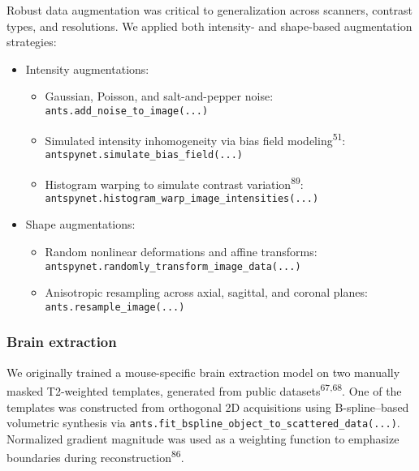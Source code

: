 \documentclass[
  12pt,
]{article}
\providecommand{\tightlist}{%
  \setlength{\itemsep}{0pt}\setlength{\parskip}{0pt}}
\begin{document}
Robust data augmentation was critical to generalization across scanners,
contrast types, and resolutions. We applied both intensity- and
shape-based augmentation strategies:

\begin{itemize}
\item
  Intensity augmentations:

  \begin{itemize}
  \tightlist
  \item
    Gaussian, Poisson, and salt-and-pepper noise:\\
    \texttt{ants.add\_noise\_to\_image(...)}
  \item
    Simulated intensity inhomogeneity via bias field
    modeling\textsuperscript{51}:\\
    \texttt{antspynet.simulate\_bias\_field(...)}
  \item
    Histogram warping to simulate contrast
    variation\textsuperscript{89}:\\
    \texttt{antspynet.histogram\_warp\_image\_intensities(...)}
  \end{itemize}
\item
  Shape augmentations:

  \begin{itemize}
  \tightlist
  \item
    Random nonlinear deformations and affine transforms:\\
    \texttt{antspynet.randomly\_transform\_image\_data(...)}
  \item
    Anisotropic resampling across axial, sagittal, and coronal planes:\\
    \texttt{ants.resample\_image(...)}
  \end{itemize}
\end{itemize}

\subsubsection{Brain extraction}\label{brain-extraction}

We originally trained a mouse-specific brain extraction model on two
manually masked T2-weighted templates, generated from public
datasets\textsuperscript{67,68}. One of the templates was constructed
from orthogonal 2D acquisitions using B-spline--based volumetric
synthesis via
\texttt{ants.fit\_bspline\_object\_to\_scattered\_data(...)}. Normalized
gradient magnitude was used as a weighting function to emphasize
boundaries during reconstruction\textsuperscript{86}.
\end{document}
